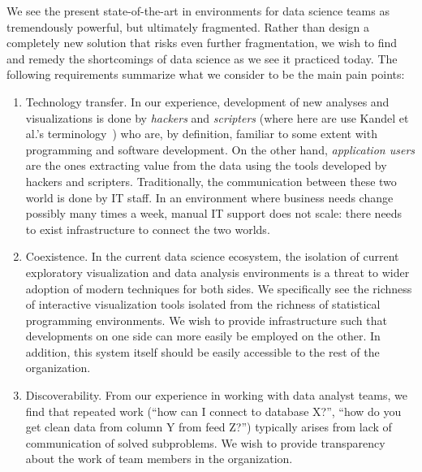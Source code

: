 


We see the present state-of-the-art in environments for data science
teams as tremendously powerful, but ultimately fragmented. Rather than
design a completely new solution that risks even further
fragmentation, we wish to find and remedy the shortcomings of data
science as we see it practiced today. The following requirements
summarize what we consider to be the main pain points:

\begin{enumerate}

\item Technology transfer. In our experience, development
of new analyses and visualizations is done by \emph{hackers}
and \emph{scripters} (where here are use Kandel et al.'s
terminology~\cite{Kandel:2012:EDA}) who are, by definition, familiar
to some extent with programming and software development.
On the other hand, \emph{application
users} are the ones extracting value from the data using the tools
developed by hackers and scripters. Traditionally, the communication
between these two world is done by IT staff. In an environment where
business needs change possibly many times a week, manual IT support
does not scale: there needs to exist
infrastructure to connect the two worlds.

\item Coexistence. In the current data science ecosystem, the
isolation of current exploratory visualization and data analysis
environments is a threat to wider adoption of modern techniques for
both sides. We specifically see the richness of interactive
visualization tools isolated from the richness of statistical
programming environments.
We wish to provide infrastructure such that
developments on one side can more easily be employed on the other. In
addition, this system itself should be easily accessible
to the rest of the organization.

\item Discoverability. From our experience in working with data
analyst teams, we find that repeated work (``how can I connect to
database X?'', ``how do you get clean data from column Y from feed
Z?'') typically arises from lack of communication of solved
subproblems. We wish to provide transparency about the work of
team members in the organization.

\end{enumerate}


